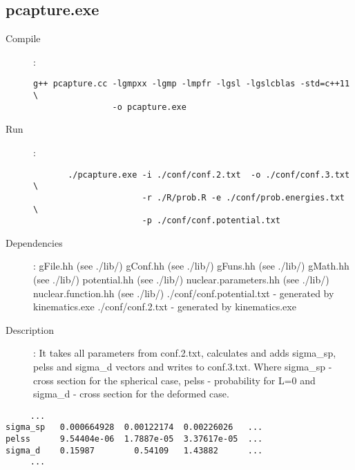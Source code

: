 \documentclass[preprint,review,12pt]{elsarticle}
\newcounter{bla}
\begin{document}
  \subsection{pcapture.exe}
  \label{sec:pcapture}

    

    \begin{description}
      
       \item[Compile]: 
               \begin{verbatim}
g++ pcapture.cc -lgmpxx -lgmp -lmpfr -lgsl -lgslcblas -std=c++11 \
                -o pcapture.exe
        \end{verbatim}
       \item[Run]:
      \begin{verbatim}
       ./pcapture.exe -i ./conf/conf.2.txt  -o ./conf/conf.3.txt \
                      -r ./R/prob.R -e ./conf/prob.energies.txt \
                      -p ./conf/conf.potential.txt 
      \end{verbatim}

       \item [Dependencies]:
           \subitem  gFile.hh                (see ./lib/)       
           \subitem  gConf.hh                (see ./lib/)       
           \subitem  gFuns.hh                (see ./lib/)       
           \subitem  gMath.hh                (see ./lib/)       
           \subitem  potential.hh            (see ./lib/)           
           \subitem  nuclear.parameters.hh   (see ./lib/)                       
           \subitem  nuclear.function.hh     (see ./lib/)                      
           \subitem  ./conf/conf.potential.txt  - generated by kinematics.exe                  
           \subitem  ./conf/conf.2.txt   - generated by kinematics.exe

       \item [Description]:
          It takes all parameters from conf.2.txt, calculates and adds sigma\_sp, pelss and sigma\_d vectors and writes to conf.3.txt.
          Where sigma\_sp - cross section for the spherical case, pelss - probability for L=0 and sigma\_d - cross section for the deformed case.
           
    \end{description}
    \begin{verbatim}
     ...
sigma_sp   0.000664928  0.00122174  0.00226026   ...
pelss      9.54404e-06  1.7887e-05  3.37617e-05  ...
sigma_d    0.15987        0.54109   1.43882      ... 
     ...
    \end{verbatim}  
\end{document}
